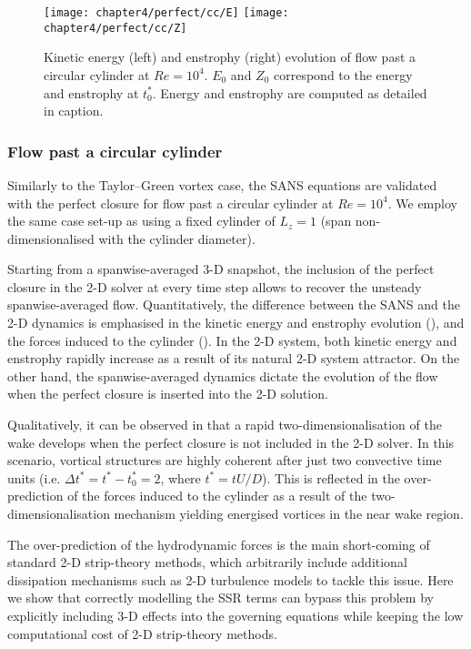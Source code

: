 \documentclass[../main.tex]{subfiles}
\begin{document}
\begin{figure}[!t]
\centering
\texttt{[image: chapter4/perfect/cc/E]}
\texttt{[image: chapter4/perfect/cc/Z]}
\caption{Kinetic energy (left) and enstrophy (right) evolution of flow past a circular cylinder at $Re=10^4$.
$E_0$ and $Z_0$ correspond to the energy and enstrophy at $t_0^*$.
Energy and enstrophy are computed as detailed in  caption.}
\label{fig:perfect_cc_EZ}
\end{figure}

\subsubsection*{Flow past a circular cylinder}\label{sec:SANS_circular_cylinder}

Similarly to the Taylor--Green vortex case, the SANS equations are validated with the perfect closure for flow past a circular cylinder at $Re=10^4$.
We employ the same case set-up as  using a fixed cylinder of $L_z=1$ (span non-dimensionalised with the cylinder diameter).

Starting from a spanwise-averaged 3-D snapshot, the inclusion of the perfect closure in the 2-D solver at every time step allows to recover the unsteady spanwise-averaged flow.
Quantitatively, the difference between the SANS and the 2-D dynamics is emphasised in the kinetic energy and enstrophy evolution (), and the forces induced to the cylinder ().
In the 2-D system, both kinetic energy and enstrophy rapidly increase as a result of its natural 2-D system attractor.
On the other hand, the spanwise-averaged dynamics dictate the evolution of the flow when the perfect closure is inserted into the 2-D solution.

Qualitatively, it can be observed in  that a rapid two-dimensionalisation of the wake develops when the perfect closure is not included in the 2-D solver.
In this scenario, vortical structures are highly coherent after just two convective time units (i.e. $\Delta t^*=t^*-t_0^*=2$, where $t^*=tU/D$).
This is reflected in the over-prediction of the forces induced to the cylinder as a result of the two-dimensionalisation mechanism yielding energised vortices in the near wake region.

The over-prediction of the hydrodynamic forces is the main short-coming of standard 2-D strip-theory methods, which arbitrarily include additional dissipation mechanisms such as 2-D turbulence models to tackle this issue.
Here we show that correctly modelling the SSR terms can bypass this problem by explicitly including 3-D effects into the governing equations while keeping the low computational cost of 2-D strip-theory methods.
\end{document}
